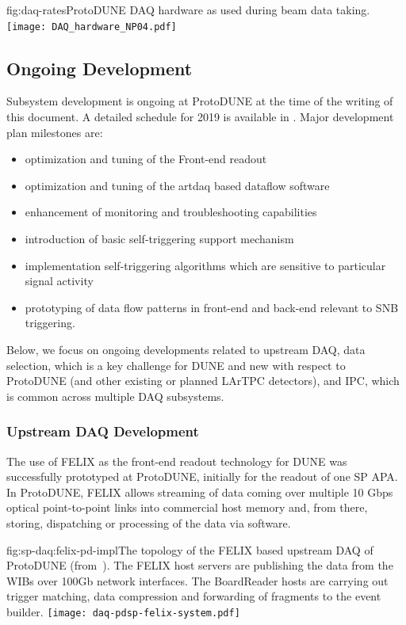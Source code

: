 \begin{dunefigure}{fig:daq-rates}{ProtoDUNE DAQ hardware as used during beam data taking. \label{fig:sp-daq:protodunedaqpic}}
  \texttt{[image: DAQ\_hardware\_NP04.pdf]}
\end{dunefigure}


\subsection{Ongoing Development}
\label{sec:daq:design-validation}


Subsystem development is ongoing at ProtoDUNE at the time of the
writing of this document. A detailed schedule for 2019 is available
in \cite{referencedocdbfromgiovanna}. Major development plan milestones are:
\begin{itemize}
\item optimization and tuning of the Front-end readout
\item optimization and tuning of the artdaq based dataflow software
\item enhancement of monitoring and troubleshooting capabilities
\item introduction of basic self-triggering support mechanism
\item implementation self-triggering algorithms which are sensitive to
  particular signal activity 
\item prototyping of data flow patterns in front-end and back-end
  relevant to SNB triggering.
\end{itemize}

Below, we focus on ongoing developments related to upstream DAQ,
data selection, which is a key challenge for DUNE and new with respect
to ProtoDUNE (and other existing or planned LArTPC detectors),
and IPC, which is common across multiple DAQ subsystems.


\subsubsection{Upstream DAQ Development}

The use of FELIX as the front-end readout technology for DUNE was successfully
prototyped at ProtoDUNE, initially for the readout of one SP APA.
In ProtoDUNE, FELIX allows streaming of data coming over multiple 10 Gbps
optical point-to-point links into commercial host memory and, from there,
storing, dispatching or processing of the data via software. 


\begin{dunefigure}{fig:sp-daq:felix-pd-impl}{The topology of the FELIX based
    upstream DAQ of ProtoDUNE (from~\cite{pdsp-felix}). The FELIX host servers are publishing the data from the WIBs over 100Gb network interfaces. The BoardReader hosts are carrying out trigger matching, data compression and forwarding of fragments to the event builder.}
  \texttt{[image: daq-pdsp-felix-system.pdf]}
\end{dunefigure}

